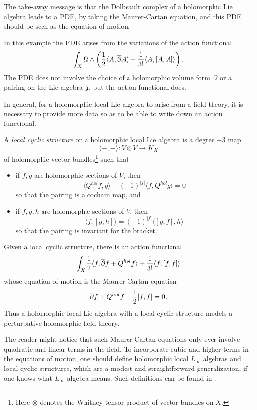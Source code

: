 \documentclass[11pt]{amsart}
\begin{document}
The take-away message is that the Dolbeault complex of a holomorphic Lie algebra leads to a PDE, by taking the Maurer-Cartan equation,
and this PDE should be seen as the equation of motion.

In this example the PDE arises from the variations of the action functional
\[
\int_X \Omega \wedge \left( \frac{1}{2}\langle A, {\overline{\partial}} A\rangle + \frac{1}{3!}\langle A, [A,A]\rangle \right).
\]
The PDE does not involve the choice of a holomorphic volume form $\Omega$ or a pairing on the Lie algebra $\mathfrak g$, 
but the action functional does.

In general, for a holomorphic local Lie algebra to arise from a field theory,
it is necessary to provide more data so as to be able to write down an action functional.

\begin{dfn}
A {\em local cyclic structure} on a holomorphic local Lie algebra is a degree $-3$ map
\[
\langle -,-\rangle \colon V \otimes V \to K_X
\]
of holomorphic vector bundles\footnote{Here $\otimes$ denotes the Whitney tensor product of vector bundles on $X$.} such that 
\begin{itemize}
\item if $f, g$ are holomorphic sections of $V$, then 
\[
\langle Q^{hol}f, g \rangle + (-1)^{|f|} \langle f, Q^{hol} g \rangle = 0
\]
so that the pairing is a cochain map, and
\item if $f, g, h$ are holomorphic sections of $V$, then 
\[
\langle f, [g,h] \rangle = (-1)^{|f|} \langle [g,f],h \rangle
\]
so that the pairing is invariant for the bracket.
\end{itemize}
\end{dfn}

Given a local cyclic structure, there is an action functional
\[
\int_X \frac{1}{2} \langle f, {\overline{\partial}} f + Q^{hol} f \rangle + \frac{1}{3!} \langle f, [f,f] \rangle 
\]
whose equation of motion is the Maurer-Cartan equation
\[
{\overline{\partial}} f + Q^{hol}f + \frac{1}{2} [f,f] = 0.
\]
Thus a holomorphic local Lie algebra with a local cyclic structure models a perturbative holomorphic field theory.

The reader might notice that such Maurer-Cartan equations only ever involve quadratic and linear terms in the field.
To incorporate cubic and higher terms in the equations of motion,
one should define holomorphic local $L_\infty$ algebras and local cyclic structures,
which are a modest and straightforward generalization, if one knows what $L_\infty$ algebra means.
Such definitions can be found in~\cite{CG2}.
\end{document}
